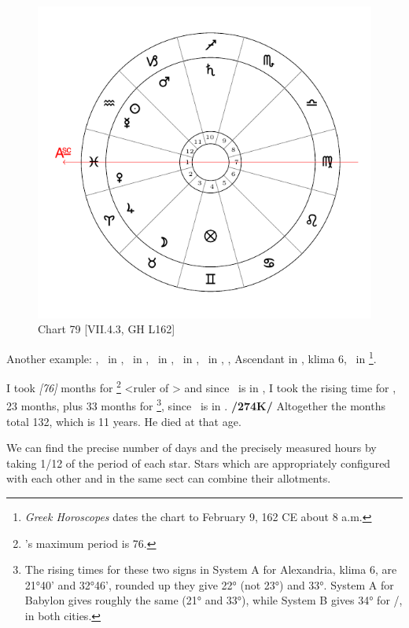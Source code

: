 \newpage
\begin{figure}
\centering
\vspace{-10pt}
\includegraphics[width=.68\textwidth]{charts/7_4_3}
\caption{Chart 79 [VII.4.3, GH L162]}
\label{fig:chart79}
\end{figure} 

Another example: \Sun, \Mercury\, in \Aquarius, \Moon\, in \Taurus, \Saturn\, in \Sagittarius, \Jupiter\, in \Aries,
\Mars\, in \Capricorn, \Venus, Ascendant in \Pisces, klima 6, \Fortune\, in \Gemini\footnote{\textit{Greek Horoscopes} dates the chart to February 9, 162 CE about 8 a.m.}. 

I took \textsl{[76]} months for \Mercury\footnote{\Mercury's maximum period is 76.} <ruler of \Gemini> and since \Mercury\, is in \Aquarius, I took the rising time for \Aquarius, 23 months, plus 33 months for \Sagittarius\footnote{The rising times for these two signs in System A for Alexandria, klima 6, are 21°40' and 32°46', rounded up they give 22° (not 23°) and 33°. System A for Babylon gives roughly the same (21° and 33°), while System B gives 34° for \Sagittarius/, in both cities.}, since \Saturn\, is in \Sagittarius. \textbf{/274K/} Altogether the months total 132, which is 11 years. He died at that age. 

We \mndl can find the precise number of days and the precisely measured hours by taking 1/12 of the period of each star. Stars which are appropriately configured with each other and in the same sect can combine their allotments. 

